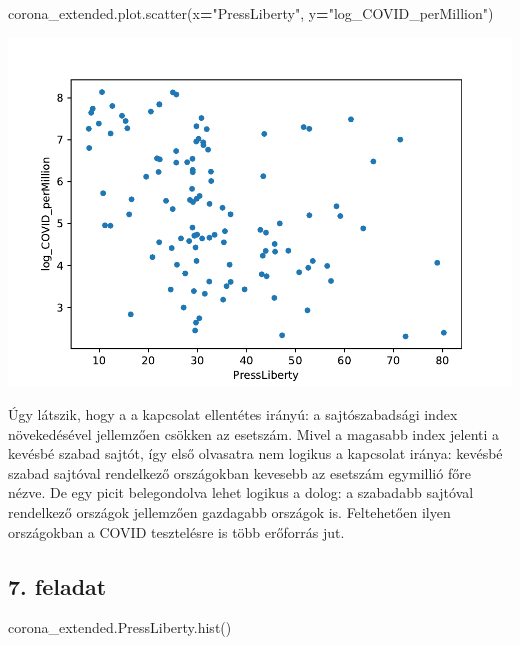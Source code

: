 \documentclass[
]{book}
\newenvironment{Shaded}{\begin{snugshade}}{\end{snugshade}}
\newcommand{\NormalTok}[1]{#1}
\newcommand{\OperatorTok}[1]{\textcolor[rgb]{0.81,0.36,0.00}{\textbf{#1}}}
\newcommand{\StringTok}[1]{\textcolor[rgb]{0.31,0.60,0.02}{#1}}
\begin{document}
\begin{Shaded}
\begin{Highlighting}[]
\NormalTok{corona\_extended.plot.scatter(x}\OperatorTok{=}\StringTok{"PressLiberty"}\NormalTok{, y}\OperatorTok{=}\StringTok{"log\_COVID\_perMillion"}\NormalTok{)}
\end{Highlighting}
\end{Shaded}

\includegraphics{_main_files/figure-latex/unnamed-chunk-139-27.pdf}

Úgy látszik, hogy a a kapcsolat ellentétes irányú: a sajtószabadsági index növekedésével jellemzően csökken az esetszám. Mivel a magasabb index jelenti a kevésbé szabad sajtót, így első olvasatra nem logikus a kapcsolat iránya: kevésbé szabad sajtóval rendelkező országokban kevesebb az esetszám egymillió főre nézve. De egy picit belegondolva lehet logikus a dolog: a szabadabb sajtóval rendelkező országok jellemzően gazdagabb országok is. Feltehetően ilyen országokban a COVID tesztelésre is több erőforrás jut.

\subsection*{7. feladat}\label{feladat-6}

\begin{Shaded}
\begin{Highlighting}[]
\NormalTok{corona\_extended.PressLiberty.hist()}
\end{Highlighting}
\end{Shaded}
\end{document}
